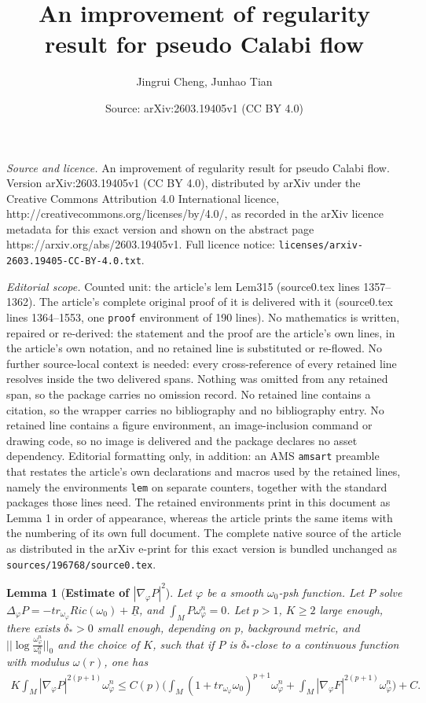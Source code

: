 \documentclass[10pt,a4paper]{amsart}
\title{An improvement of regularity result for pseudo Calabi flow}
\author{Jingrui Cheng, Junhao Tian}
\date{Source: arXiv:2603.19405v1 (CC BY 4.0)}
\newtheorem{lem}{Lemma}
\begin{document}
\maketitle

\noindent\emph{Source and licence.} An improvement of regularity result for pseudo Calabi flow. Version arXiv:2603.19405v1 (CC BY 4.0), distributed by arXiv under the Creative Commons Attribution 4.0 International licence, http://creativecommons.org/licenses/by/4.0/, as recorded in the arXiv licence metadata for this exact version and shown on the abstract page https://arxiv.org/abs/2603.19405v1. Full licence notice: \texttt{licenses/arxiv-2603.19405-CC-BY-4.0.txt}.\par\smallskip

\noindent\textit{Editorial scope.} Counted unit: the article's lem Lem315 (source0.tex lines 1357--1362). The article's complete original proof of it is delivered with it (source0.tex lines 1364--1553, one \texttt{proof} environment of 190 lines). No mathematics is written, repaired or re-derived: the statement and the proof are the article's own lines, in the article's own notation, and no retained line is substituted or re-flowed.  No further source-local context is needed: every cross-reference of every retained line resolves inside the two delivered spans.  Nothing was omitted from any retained span, so the package carries no omission record.  No retained line contains a citation, so the wrapper carries no bibliography and no bibliography entry.  No retained line contains a figure environment, an image-inclusion command or drawing code, so no image is delivered and the package declares no asset dependency.  Editorial formatting only, in addition: an AMS \texttt{amsart} preamble that restates the article's own declarations and macros used by the retained lines, namely the environments \texttt{lem} on separate counters, together with the standard packages those lines need.  The retained environments print in this document as Lemma 1 in order of appearance, whereas the article prints the same items with the numbering of its own full document.  The complete native source of the article as distributed in the arXiv e-print for this exact version is bundled unchanged as \texttt{sources/196768/source0.tex}.
\begin{lem}[\textbf{Estimate of $|\nabla_\varphi P|^2$}]\label{Lem315}
	Let $\varphi$ be a smooth $\omega_0$-psh function.  Let $P$ solve $\Delta_{\varphi}P=-tr_{\omega_{\varphi}}Ric(\omega_0)+\underline{R}$,  and $\int_MP\omega_{\varphi}^n=0$.  Let $p>1$,  $K\ge 2$ large enough,  there exists $\delta_*>0$ small enough,  depending on $p$,  background metric,  and $||\log\frac{\omega_{\varphi}^n}{\omega_0^n}||_0$ and the choice of $K$,  such that if $P$ is $\delta_*$-close to a continuous function with modulus $\omega(r)$,  one has 
	\begin{align}
		K\int_M|\nabla_{\varphi}P|^{2(p+1)}\omega_{\varphi}^n\le C(p)\big(\int_M(1+tr_{\omega_{\varphi}}\omega_0)^{p+1}\omega_{\varphi}^n+\int_M|\nabla_{\varphi}F|^{2(p+1)}\omega_{\varphi}^n\big)+C. 
	\end{align}\\
\end{lem}
\end{document}
